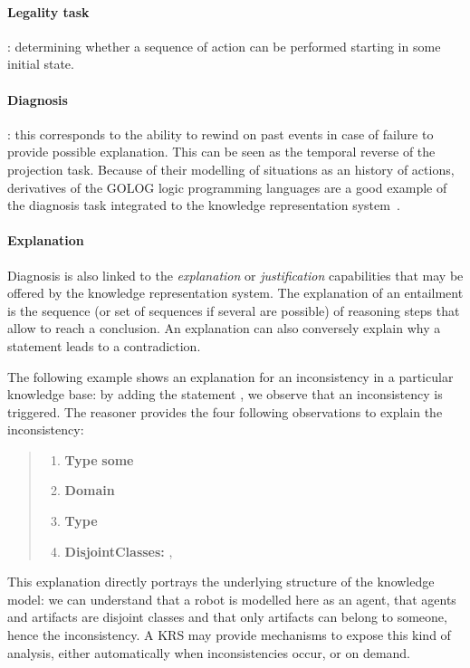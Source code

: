 \paragraph{Legality task}: determining whether a sequence of action can be
performed starting in some initial state.

\paragraph{Diagnosis}: this corresponds to the ability to rewind on past events
in case of failure to provide possible explanation. This can be seen as the
temporal reverse of the projection task. Because of their modelling of
situations as an history of actions, derivatives of the GOLOG logic programming
languages are a good example of the diagnosis task integrated to the knowledge
representation system~\cite{Gspandl2011}.

\paragraph{Explanation} Diagnosis is also linked to the \emph{explanation} or
\emph{justification} capabilities that may be offered by the knowledge
representation system. The explanation of an entailment is the sequence (or
set of sequences if several are possible) of reasoning steps that allow to
reach a conclusion. An explanation can also conversely explain why a statement leads to a
contradiction.

The following example shows an explanation for an inconsistency in a particular
knowledge base: by adding the statement , we
observe that an inconsistency is triggered. The reasoner provides the four
following observations to explain the inconsistency:

\begin{quote}
\scriptsize
\begin{enumerate}
    \item {} {\bf Type}  {\bf some} 
    \item {} {\bf Domain} 
    \item {} {\bf Type} 
    \item {\bf DisjointClasses:} , 
\end{enumerate}
\normalsize
\end{quote}

This explanation directly portrays the underlying structure of the knowledge
model: we can understand that a robot is modelled here as an agent, that agents
and artifacts are disjoint classes and that only artifacts can belong to
someone, hence the inconsistency. A KRS may provide mechanisms to expose this
kind of analysis, either automatically when inconsistencies occur, or on
demand.

